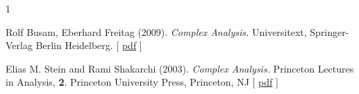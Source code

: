 \documentclass[12pt,reqno]{amsart}
\theoremstyle{plain}
\numberwithin{equation}{section}
\begin{document}
\vfill 

\vfill



\begin{thebibliography}{1}

Rolf Busam, Eberhard Freitag (2009). {\it Complex Analysis.} Universitext, Springer-Verlag Berlin Heidelberg. [ \href{https://indico.eimi.ru/event/1833/attachments/430/909/Complex_Analysis_Universitext_Eberhard_Freitag_Rolf_Busam_2005.pdf}{pdf} ]\vskip 5pt

Elias M. Stein and Rami Shakarchi (2003). {\it Complex Analysis.} Princeton Lectures in Analysis, {\bf 2}. Princeton University Press, Princeton, NJ [ \href{https://drive.google.com/file/d/0B45juCGJ7U7POGY0Y2Y2YjctMTRhOC00ZGJhLTk3MTgtNjJhZjAyMTljNGYw/view?resourcekey=0-JxrgvBLMJJNURCsJolbxrA}{pdf} ]\vskip 5pt





\end{thebibliography}
\end{document}
